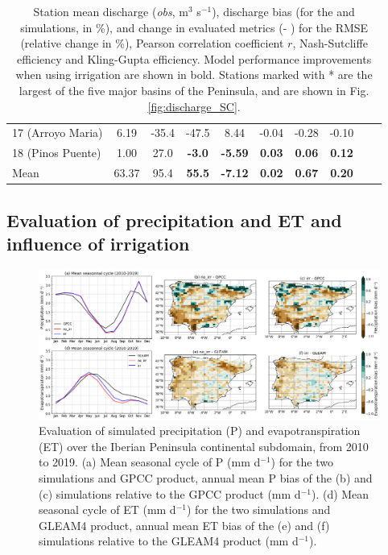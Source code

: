 \begin{table}[hbtp]
{\begin{tabular}{lccccccccc}
        17 (Arroyo Maria)   & 6.19    & -35.4 & -47.5 & 8.44   & -0.04 & -0.28 & -0.10 \\
        18 (Pinos Puente)   & 1.00    & 27.0 & \textbf{-3.0}   & \textbf{-5.59}  & \textbf{0.03}  & \textbf{0.06}  & \textbf{0.12}  \\
        \midrule
        Mean                & 63.37   & 95.4 & \textbf{55.5}   & \textbf{-7.12} & \textbf{0.02}  & \textbf{0.67}  & \textbf{0.20}  \\
        \bottomrule
    \end{tabular}
    }
    \caption{Station mean discharge (\textit{obs}, m$^3$ s$^{-1}$), discharge bias (for the \noirr and \irr simulations, in \%), and change in evaluated metrics (\irr - \noirr) for the RMSE (relative change in \%), Pearson correlation coefficient $r$, Nash-Sutcliffe efficiency and Kling-Gupta efficiency. Model performance improvements when using irrigation are shown in bold. Stations marked with * are the largest of the five major basins of the Peninsula, and are shown in Fig. \ref{fig:discharge_SC}.}
    \label{table:stations_metrics}
\end{table}


\subsection{Evaluation of precipitation and ET and influence of irrigation}

\begin{figure}[htbp]
    \centering
    \includegraphics[width=\textwidth]{images/chap4/article/f06.png}
    \caption{Evaluation of simulated precipitation (P) and evapotranspiration (ET) over the Iberian Peninsula continental subdomain, from 2010 to 2019. 
    (a) Mean seasonal cycle of P (mm d$^{-1}$) for the two simulations and GPCC product, annual mean P bias of the (b) \noirr and (c) \irr simulations relative to the GPCC product (mm d$^{-1}$).
    (d) Mean seasonal cycle of ET (mm d$^{-1}$) for the two simulations and GLEAM4 product, annual mean ET bias of the (e) \noirr and (f) \irr simulations relative to the GLEAM4 product (mm d$^{-1}$).}
    \label{fig:sim_eval_ET_P}
\end{figure}

